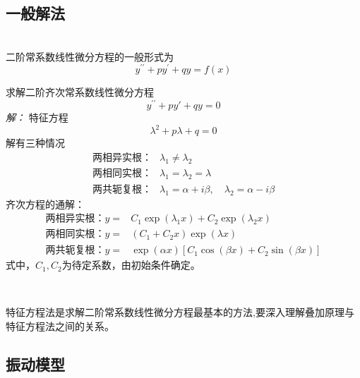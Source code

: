 	\subsection{一般解法} ~\\

	二阶常系数线性微分方程的一般形式为 
	\begin{equation}
		y^{\prime \prime}+py^{\prime}+qy=f(x)
	\end{equation}
	\begin{example} 
	求解二阶齐次常系数线性微分方程
		$$  y^{\prime \prime}+py'+qy=0 $$
	\emph{解：}
		特征方程
		$$ \lambda^2 +p\lambda +q=0  $$
		解有三种情况
		$$ \begin{aligned}
			\text{两相异实根：}& \lambda_1 \ne \lambda_2  \\
			\text{两相同实根：}& \lambda_1 = \lambda_2 = \lambda  \\
			\text{两共轭复根：}& \lambda_1=\alpha+i\beta , \quad \lambda_2=\alpha-i\beta
		\end{aligned}$$
	   齐次方程的通解：
	   $$ \begin{aligned}
		\text{两相异实根：}y=& C_1 \exp(\lambda_1 x)+ C_2 \exp (\lambda_2 x)   \\
		\text{两相同实根：}y=& (C_1+C_2x)  \exp (\lambda x)  \\
		\text{两共轭复根：}y=&  \exp(\alpha x)  [C_1 \cos (\beta x)+ C_2 \sin (\beta x)]
	\end{aligned}$$
	式中，$C_1,C_2$为待定系数，由初始条件确定。
	\end{example}
	~\\
	\begin{hint} 
		特征方程法是求解二阶常系数线性微分方程最基本的方法,要深入理解叠加原理与特征方程法之间的关系。
	\end{hint}

\subsection{振动模型} ~\\

